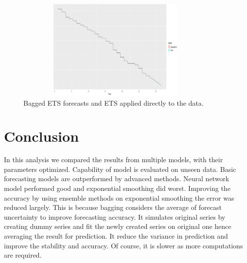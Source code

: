 \documentclass[runningheads]{llncs}
\begin{document}
\begin{figure}
\centering
\includegraphics[scale=1,width=10cm,height=5cm]{BaggedETS.png} 
\caption{Bagged ETS forecasts and ETS applied directly to the data.}
\end{figure}

\section{Conclusion}
In this analysis we compared the results from multiple models, with their parameters optimized. Capability of model is evaluated on unseen data. Basic forecasting models are outperformed by advanced methods. Neural network model performed good and exponential smoothing did worst. Improving the accuracy by using ensemble methods on exponential smoothing the error was reduced largely. This is because bagging considers the average of forecast uncertainty to improve forecasting accuracy. It simulates original series by creating dummy series and fit the newly created series on original one hence averaging the result for prediction. It reduce the variance in prediction and improve the stability and accuracy. Of course, it is slower as more computations are required.
\end{document}
